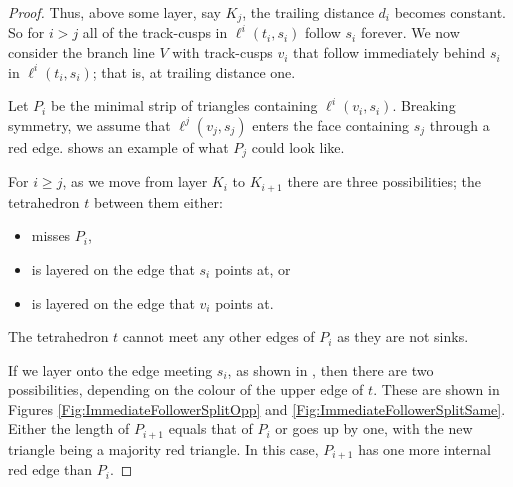 \documentclass[12pt]{amsart}
\begin{document}
\begin{proof}
Thus, above some layer, say $K_j$, the trailing distance $d_i$ becomes constant.  So for $i > j$ all of the track-cusps in $\ell^i(t_i, s_i)$ follow $s_i$ forever.  We now consider the branch line $V$ with track-cusps $v_i$ that follow immediately behind $s_i$ in $\ell^i(t_i, s_i)$; that is, at trailing distance one.

\begin{figure}[htbp]
\centering
{}

\qquad
{}
\qquad
{}
\caption{}
\label{Fig:ImmediateFollowerChanges}
\end{figure}

Let $P_i$ be the minimal strip of triangles containing $\ell^i(v_i, s_i)$.  Breaking symmetry, we assume that $\ell^j(v_j, s_j)$ enters the face containing $s_j$ 
through a red edge.   shows an example of what $P_j$ could look like.   

For $i \geq j$, as we move from layer $K_i$ to $K_{i+1}$ there are three possibilities; the tetrahedron $t$ between them either:
\begin{itemize}
\item misses $P_i$, 
\item is layered on the edge that $s_i$ points at, or 
\item is layered on the edge that $v_i$ points at. 
\end{itemize}
The tetrahedron $t$ cannot meet any other edges of $P_i$ as they are not sinks. 

If we layer onto the edge meeting $s_i$, as shown in , then there are two possibilities, depending on the colour of the upper edge of $t$. These are shown in Figures \ref{Fig:ImmediateFollowerSplitOpp} and \ref{Fig:ImmediateFollowerSplitSame}.  Either the length of $P_{i+1}$ equals that of $P_i$ or goes up by one, with the new triangle being a majority red triangle.  In this case, $P_{i+1}$ has one more internal red edge than $P_i$. 


\end{proof}
\end{document}
